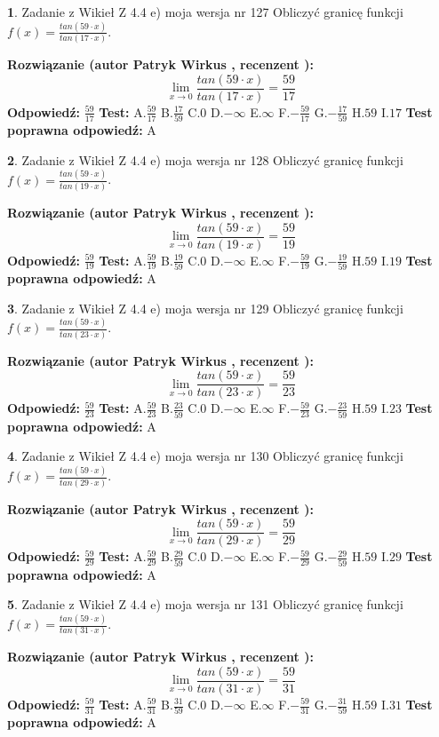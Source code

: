 \documentclass[12pt, a4paper]{article}
\theoremstyle{definition} %
\newtheorem{zad}{}
\newcommand{\zadStart}[1]{\begin{zad}#1\newline}
\newcommand{\zadStop}{\end{zad}}
\newcommand{\rozwStart}[2]{\noindent \textbf{Rozwiązanie (autor #1 , recenzent #2): }\newline}
\newcommand{\rozwStop}{\newline}
\newcommand{\odpStart}{\noindent \textbf{Odpowiedź:}\newline}
\newcommand{\odpStop}{\newline}
\newcommand{\testStart}{\noindent \textbf{Test:}\newline}
\newcommand{\testStop}{\newline}
\newcommand{\kluczStart}{\noindent \textbf{Test poprawna odpowiedź:}\newline}
\newcommand{\kluczStop}{\newline}
\begin{document}
\zadStart{Zadanie z Wikieł Z 4.4 e) moja wersja nr 127}
Obliczyć granicę funkcji $f(x)=\frac{tan(59\cdot x)}{tan(17\cdot x)}$.
\zadStop
\rozwStart{Patryk Wirkus}{}
$$\lim\limits_{x\to 0}\frac{tan(59\cdot x)}{tan(17\cdot x)}=
\frac{59}{17}$$
\rozwStop
\odpStart
$\frac{59}{17}$
\odpStop
\testStart
A.$\frac{59}{17}$
B.$\frac{17}{59}$
C.$0$
D.$-\infty$
E.$\infty$
F.$-\frac{59}{17}$
G.$-\frac{17}{59}$
H.$59$
I.$17$
\testStop
\kluczStart
A
\kluczStop



\zadStart{Zadanie z Wikieł Z 4.4 e) moja wersja nr 128}
Obliczyć granicę funkcji $f(x)=\frac{tan(59\cdot x)}{tan(19\cdot x)}$.
\zadStop
\rozwStart{Patryk Wirkus}{}
$$\lim\limits_{x\to 0}\frac{tan(59\cdot x)}{tan(19\cdot x)}=
\frac{59}{19}$$
\rozwStop
\odpStart
$\frac{59}{19}$
\odpStop
\testStart
A.$\frac{59}{19}$
B.$\frac{19}{59}$
C.$0$
D.$-\infty$
E.$\infty$
F.$-\frac{59}{19}$
G.$-\frac{19}{59}$
H.$59$
I.$19$
\testStop
\kluczStart
A
\kluczStop



\zadStart{Zadanie z Wikieł Z 4.4 e) moja wersja nr 129}
Obliczyć granicę funkcji $f(x)=\frac{tan(59\cdot x)}{tan(23\cdot x)}$.
\zadStop
\rozwStart{Patryk Wirkus}{}
$$\lim\limits_{x\to 0}\frac{tan(59\cdot x)}{tan(23\cdot x)}=
\frac{59}{23}$$
\rozwStop
\odpStart
$\frac{59}{23}$
\odpStop
\testStart
A.$\frac{59}{23}$
B.$\frac{23}{59}$
C.$0$
D.$-\infty$
E.$\infty$
F.$-\frac{59}{23}$
G.$-\frac{23}{59}$
H.$59$
I.$23$
\testStop
\kluczStart
A
\kluczStop



\zadStart{Zadanie z Wikieł Z 4.4 e) moja wersja nr 130}
Obliczyć granicę funkcji $f(x)=\frac{tan(59\cdot x)}{tan(29\cdot x)}$.
\zadStop
\rozwStart{Patryk Wirkus}{}
$$\lim\limits_{x\to 0}\frac{tan(59\cdot x)}{tan(29\cdot x)}=
\frac{59}{29}$$
\rozwStop
\odpStart
$\frac{59}{29}$
\odpStop
\testStart
A.$\frac{59}{29}$
B.$\frac{29}{59}$
C.$0$
D.$-\infty$
E.$\infty$
F.$-\frac{59}{29}$
G.$-\frac{29}{59}$
H.$59$
I.$29$
\testStop
\kluczStart
A
\kluczStop



\zadStart{Zadanie z Wikieł Z 4.4 e) moja wersja nr 131}
Obliczyć granicę funkcji $f(x)=\frac{tan(59\cdot x)}{tan(31\cdot x)}$.
\zadStop
\rozwStart{Patryk Wirkus}{}
$$\lim\limits_{x\to 0}\frac{tan(59\cdot x)}{tan(31\cdot x)}=
\frac{59}{31}$$
\rozwStop
\odpStart
$\frac{59}{31}$
\odpStop
\testStart
A.$\frac{59}{31}$
B.$\frac{31}{59}$
C.$0$
D.$-\infty$
E.$\infty$
F.$-\frac{59}{31}$
G.$-\frac{31}{59}$
H.$59$
I.$31$
\testStop
\kluczStart
A
\kluczStop
\end{document}

